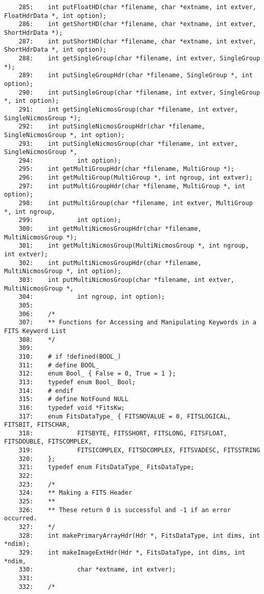 \begin{scriptsize}
\begin{verbatim}
    285:    int putFloatHD(char *filename, char *extname, int extver, FloatHdrData *, int option);
    286:    int getShortHD(char *filename, char *extname, int extver, ShortHdrData *);
    287:    int putShortHD(char *filename, char *extname, int extver, ShortHdrData *, int option);
    288:    int getSingleGroup(char *filename, int extver, SingleGroup *);
    289:    int putSingleGroupHdr(char *filename, SingleGroup *, int option);
    290:    int putSingleGroup(char *filename, int extver, SingleGroup *, int option);
    291:    int getSingleNicmosGroup(char *filename, int extver, SingleNicmosGroup *);
    292:    int putSingleNicmosGroupHdr(char *filename, SingleNicmosGroup *, int option);
    293:    int putSingleNicmosGroup(char *filename, int extver, SingleNicmosGroup *, 
    294:            int option);
    295:    int getMultiGroupHdr(char *filename, MultiGroup *);
    296:    int getMultiGroup(MultiGroup *, int ngroup, int extver);
    297:    int putMultiGroupHdr(char *filename, MultiGroup *, int option);
    298:    int putMultiGroup(char *filename, int extver, MultiGroup *, int ngroup, 
    299:            int option);
    300:    int getMultiNicmosGroupHdr(char *filename, MultiNicmosGroup *);
    301:    int getMultiNicmosGroup(MultiNicmosGroup *, int ngroup, int extver);
    302:    int putMultiNicmosGroupHdr(char *filename, MultiNicmosGroup *, int option);
    303:    int putMultiNicmosGroup(char *filename, int extver, MultiNicmosGroup *, 
    304:            int ngroup, int option);
    305:    
    306:    /*
    307:    ** Functions for Accessing and Manipulating Keywords in a FITS Keyword List
    308:    */
    309:    
    310:    # if !defined(BOOL_)
    311:    # define BOOL_
    312:    enum Bool_ { False = 0, True = 1 };
    313:    typedef enum Bool_ Bool;
    314:    # endif
    315:    # define NotFound NULL
    316:    typedef void *FitsKw;
    317:    enum FitsDataType_ { FITSNOVALUE = 0, FITSLOGICAL, FITSBIT, FITSCHAR, 
    318:            FITSBYTE, FITSSHORT, FITSLONG, FITSFLOAT, FITSDOUBLE, FITSCOMPLEX, 
    319:            FITSICOMPLEX, FITSDCOMPLEX, FITSVADESC, FITSSTRING
    320:    };
    321:    typedef enum FitsDataType_ FitsDataType;
    322:    
    323:    /* 
    324:    ** Making a FITS Header 
    325:    **
    326:    ** These return 0 is successful and -1 if an error occurred.
    327:    */
    328:    int makePrimaryArrayHdr(Hdr *, FitsDataType, int dims, int *ndim);
    329:    int makeImageExtHdr(Hdr *, FitsDataType, int dims, int *ndim, 
    330:            char *extname, int extver);
    331:    
    332:    /* 

\end{verbatim}
\end{scriptsize}

